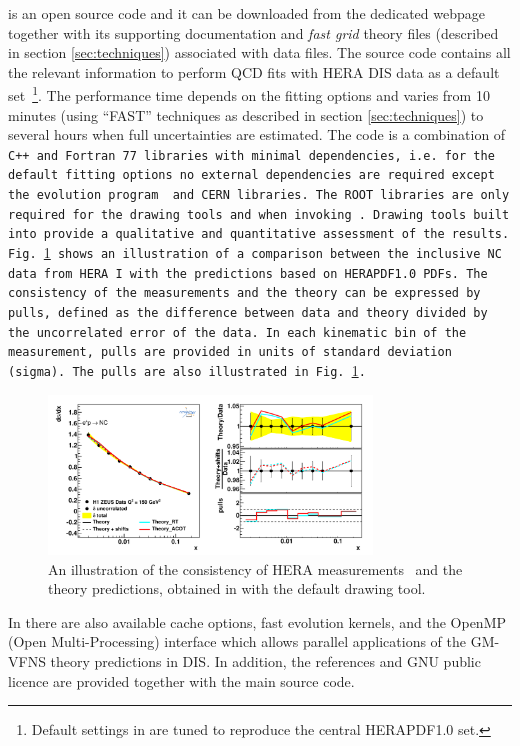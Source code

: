 
\fitter is an open source code and it can be downloaded from the dedicated webpage \cite{herafitter:page}
together with its supporting documentation and 
\emph{fast grid} theory files (described in section \ref{sec:techniques}) associated with data files.
The source code contains all the relevant information to perform QCD fits with HERA DIS data as a default 
set~\footnote{Default settings in \fitter are tuned to reproduce the central HERAPDF1.0 set.}. 
The performance time depends on the fitting options and varies from 10 minutes 
(using ``FAST'' techniques as described in section \ref{sec:techniques}) to several hours when 
full uncertainties are estimated. The \fitter code is a combination of \tt C++ \rm and \tt Fortran 77\rm \ libraries with minimal 
dependencies, i.e. for the default fitting options no external dependencies are required except the \qcdnum evolution program \cite{qcdnum} and CERN libraries. 
The \tt ROOT \rm  libraries are only required for the drawing tools and when invoking \applgrid.  
Drawing tools built into \fitter provide a qualitative and quantitative assessment of the results.
Fig.~\ref{fig:data} shows an illustration of a comparison between the inclusive NC data from HERA I
with the predictions based on HERAPDF1.0 PDFs.
The consistency of the measurements and the theory can be expressed by pulls, defined as the difference between data and theory divided by the uncorrelated error of the data. 
In each kinematic bin of the measurement, pulls are provided in units of standard deviation (sigma).  
The pulls are also illustrated in Fig.~\ref{fig:data}.
\begin{figure}[!ht]
   \centering
   \includegraphics[width=8.6cm]{datatheory.pdf}
   \caption{An illustration of the consistency of HERA measurements~\cite{h1zeus:2009wt} and the theory predictions, 
       obtained in \fitter with the default drawing tool.} 
 \label{fig:data}
\end{figure}


In \fitter there are also available cache options, fast evolution kernels, and the OpenMP (Open Multi-Processing) 
interface which allows parallel applications of the GM-VFNS theory predictions in DIS. 
In addition, the \fitter references and GNU public licence are provided 
together with the main source code. 



